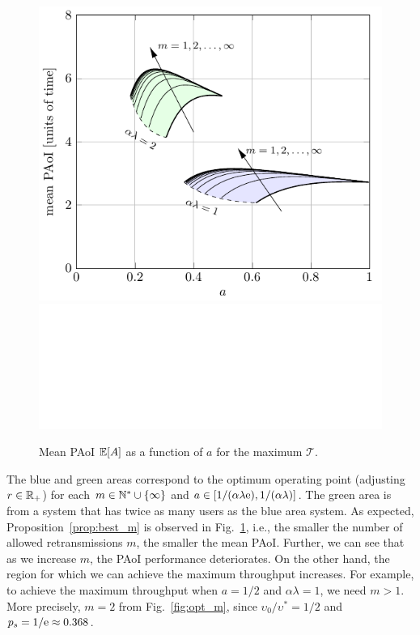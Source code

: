 \begin{figure}[htb]
    \centering
    \if{}
        \includegraphics[]{Figures/Ch6_PAoI_a.pdf}
    \else
        \includegraphics[draft, width=\textwidth]{Figures/placeholder.png}
    \fi
    \caption{Mean PAoI ${\mathbb E}[A]$ as a function of $a$ for the maximum $\mathscr{T}$.}
    \label{fig:PAoI_a}
\end{figure}

The blue and green areas correspond to the optimum operating point (adjusting $r\in{\mathbb R}_+$) for each $m\in{\mathbb N}^*\cup\{\infty\}$ and $a\in[1/(\alpha\lambda\mathrm{e}),1/(\alpha\lambda)]$. The green area is from a system that has twice as many users as the blue area system.
%
As expected, Proposition~\ref{prop:best_m} is observed in Fig.~\ref{fig:PAoI_a}, i.e., the smaller the number of allowed retransmissions $m$, the smaller the mean PAoI.
%
Further, we can see that as we increase $m$, the PAoI performance deteriorates. On the other hand, the region for which we can achieve the maximum throughput increases. For example, to achieve the maximum throughput when $a=1/2$ and $\alpha\lambda=1$, we need $m>1$. More precisely, $m=2$ from Fig.~\ref{fig:opt_m}, since $\upsilon_0/\upsilon^* = 1/2$ and $p_s = 1/\mathrm{e}\approx 0.368$.

